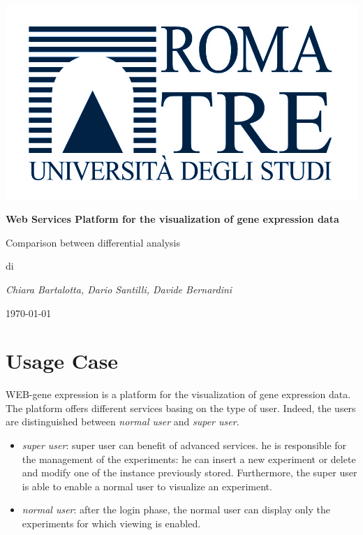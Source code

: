 \documentclass[a4paper]{report}
\begin{document}
\begin{titlepage}
\centering
{}
\includegraphics{logoRomaTre.jpg}\\
{\LARGE \bf Web Services Platform for the visualization of gene expression data\par}
\vspace{0.5cm}
{\Large Comparison between differential analysis\par} 
\vspace{2cm}
di\\
{\Large \em Chiara Bartalotta, Dario Santilli, Davide Bernardini\par}
\date{\currenttime}
\today
\end{titlepage}


\chapter{Usage Case}
WEB-gene expression is a platform for the visualization of gene expression data. The platform offers different services basing on the type of user. Indeed, the users are distinguished between \emph{normal user} and \emph{super user}.
\begin{itemize}
   \item \textit{super user}: super user can benefit of advanced services. he is responsible for the management of the experiments: he can insert a new experiment or delete and modify one of the instance previously stored. Furthermore, the super user is able to enable a normal user to visualize an experiment. 
   \item \textit{normal user}: after the login phase, the normal user can display only the experiments for which viewing is enabled.
\end{itemize}
\end{document}
